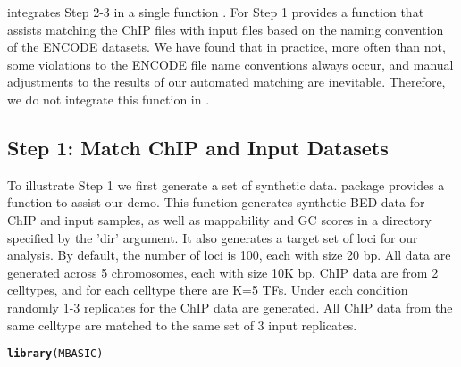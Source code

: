 \documentclass[a4paper,10pt]{article}\usepackage[]{graphicx}\usepackage[]{color}
\makeatletter
\newcommand{\hlstd}[1]{\textcolor[rgb]{0.345,0.345,0.345}{#1}}%
\newcommand{\hlkwd}[1]{\textcolor[rgb]{0.737,0.353,0.396}{\textbf{#1}}}%
\newenvironment{kframe}{%
 \def\at@end@of@kframe{}%
 \ifinner\ifhmode%
  \def\at@end@of@kframe{\end{minipage}}%
  \begin{minipage}{\columnwidth}%
 \fi\fi%
 \def\FrameCommand##1{\hskip\@totalleftmargin \hskip-\fboxsep
 \colorbox{shadecolor}{##1}\hskip-\fboxsep
     \hskip-\linewidth \hskip-\@totalleftmargin \hskip\columnwidth}%
 \MakeFramed {\advance\hsize-\width
   \@totalleftmargin\z@ \linewidth\hsize
   \@setminipage}}%
 {\par\unskip\endMakeFramed%
 \at@end@of@kframe}
\newenvironment{knitrout}{}{} %
\makeatother
\begin{document}
 integrates Step 2-3 in a single function . For Step 1  provides a function  that assists matching the ChIP files with input files based on the naming convention of the ENCODE datasets. We have found that in practice, more often than not, some violations to the ENCODE file name conventions always occur, and manual adjustments to the results of our automated matching are inevitable. Therefore, we do not integrate this function in .

\subsection{Step 1: Match ChIP and Input Datasets}



To illustrate Step 1 we first generate a set of synthetic data.  package provides a function  to assist our demo. This function generates synthetic BED data for ChIP and input samples, as well as mappability and GC scores in a directory specified by the 'dir' argument. It also generates a target set of loci for our analysis. By default, the number of loci is 100, each with size 20 bp. All data are generated across 5 chromosomes, each with size 10K bp. ChIP data are from 2 celltypes, and for each celltype there are K=5 TFs. Under each condition randomly 1-3 replicates for the ChIP data are generated. All ChIP data from the same celltype are matched to the same set of 3 input replicates.

\begin{knitrout}
\color{fgcolor}\begin{kframe}
\begin{alltt}
\hlkwd{library}\hlstd{(MBASIC)}
\end{alltt}
\end{kframe}
\end{knitrout}
\end{document}
